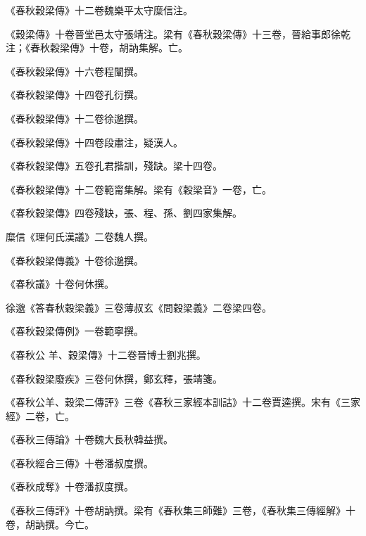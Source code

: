 \begin{pinyinscope}
 《春秋穀梁傳》十二卷魏樂平太守糜信注。



 《穀梁傳》十卷晉堂邑太守張靖注。梁有《春秋穀梁傳》十三卷，晉給事郎徐乾注；《春秋穀梁傳》十卷，胡訥集解。亡。



 《春秋穀梁傳》十六卷程闡撰。



 《春秋穀梁傳》十四卷孔衍撰。



 《春秋穀梁傳》十二卷徐邈撰。



 《春秋穀梁傳》十四卷段肅注，疑漢人。



 《春秋穀梁傳》五卷孔君揩訓，殘缺。梁十四卷。



 《春秋穀梁傳》十二卷範甯集解。梁有《穀梁音》一卷，亡。



 《春秋穀梁傳》四卷殘缺，張、程、孫、劉四家集解。



 糜信《理何氏漢議》二卷魏人撰。



 《春秋穀梁傳義》十卷徐邈撰。



 《春秋議》十卷何休撰。



 徐邈《答春秋穀梁義》三卷薄叔玄《問穀梁義》二卷梁四卷。



 《春秋穀梁傳例》一卷範寧撰。



 《春秋公
 羊、穀梁傳》十二卷晉博士劉兆撰。



 《春秋穀梁廢疾》三卷何休撰，鄭玄釋，張靖箋。



 《春秋公羊、穀梁二傳評》三卷《春秋三家經本訓詁》十二卷賈逵撰。宋有《三家經》二卷，亡。



 《春秋三傳論》十卷魏大長秋韓益撰。



 《春秋經合三傳》十卷潘叔度撰。



 《春秋成奪》十卷潘叔度撰。



 《春秋三傳評》十卷胡訥撰。梁有《春秋集三師難》三卷，《春秋集三傳經解》十卷，胡訥撰。今亡。




\end{pinyinscope}

